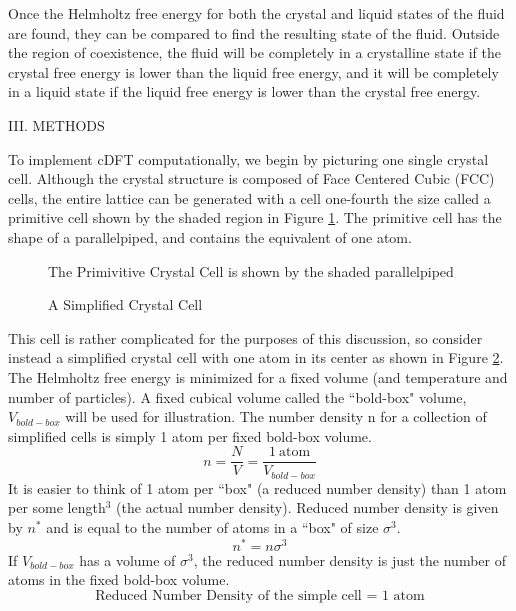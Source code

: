 \documentclass[12pt]{article}
\begin{document}
Once the Helmholtz free energy for both the crystal and liquid states of the fluid are found, they can be compared to find the resulting state of the fluid. Outside the region of coexistence, the fluid will be completely in a crystalline state if the crystal free energy is lower than the liquid free energy, and it will be completely in a liquid state if the liquid free energy is lower than the crystal free energy. 

\[{}\]
III. METHODS

To implement cDFT computationally, we begin by picturing one single crystal cell. Although the crystal structure is composed of Face Centered Cubic (FCC) cells, the entire lattice can be generated with a cell one-fourth the size called a primitive cell shown by the shaded region in Figure \ref{fig:primitivecell}. The primitive cell has the shape of a parallelpiped, and contains the equivalent of one atom.
 
  \begin{figure}[h!]
    \centering
    \caption{The Primivitive Crystal Cell is shown by the shaded parallelpiped}
    \label{fig:primitivecell}
  \end{figure}


  \begin{figure}[h!]
    \centering
    \caption{A Simplified Crystal Cell}
    \label{fig:simplecell}
  \end{figure}


This cell is rather complicated for the purposes of this discussion, so consider instead a simplified crystal cell with one atom in its center as shown in Figure \ref{fig:simplecell}. 
The Helmholtz free energy is minimized for a fixed volume (and temperature and number of particles).  A fixed cubical volume called the ``bold-box" volume, $V_{bold-box}$ will be used for illustration. The number density n for a collection of simplified cells is simply 1 atom per fixed bold-box volume.
\begin{displaymath}{n = \frac{N}{V}=\frac{1~\text{atom}}{V_{bold-box}}}\end{displaymath} It is easier to think of 1 atom per ``box" (a reduced number density) than 1 atom per some length$^3$ (the actual number density). Reduced number density is given by $n^*$ and is equal to the number of atoms in a ``box" of size $\sigma^3$.
\begin{displaymath}{n^*=n\sigma^3}\end{displaymath} If $V_{bold-box}$  has a volume of $\sigma^3$, the reduced number density is just the number of atoms in the fixed bold-box volume. 
\begin{displaymath}\text{Reduced Number Density of the simple cell = 1 atom}\end{displaymath} 
\end{document}
